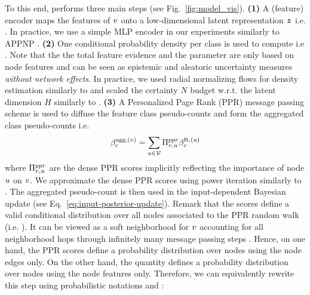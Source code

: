To this end, \oursacro{} performs three main steps (see Fig.~\ref{fig:model_vis}). \textbf{(1)} A (feature) encoder maps the features of $v$ onto a low-dimensional latent representation $\bm{z}$ i.e. . In practice, we use a simple MLP encoder in our experiments similarly to APPNP \citep{Klicpera2018}. \textbf{(2)} One conditional probability density per class \smash{$\prob(\z^{(\nodev)} \condition \iclass; \vphi)$} is used to compute  i.e . Note that the the total feature evidence  and the parameter  are only based on node features and can be seen as epistemic and aleatoric uncertainty measures \emph{without network effects}. In practice, we used radial normalizing flows for density estimation similarly to \citep{charpentier2020} and scaled the certainty $N$ budget w.r.t. the latent dimension $H$ similarly to \citep{NatPN2021}. \textbf{(3)} A Personalized Page Rank (PPR) message passing scheme is used to diffuse the feature class pseudo-counts  and form the aggregated class pseudo-counts  i.e.
\begin{equation}\label{eq:agg-evidence}
    \beta_c^{\text{agg}, (v)} = \sum_{u \in \mathcal{V}} \Pi^{ppr}_{v, u} \beta_c^{\text{ft}, (u)}
\end{equation}
where $\Pi^{ppr}_{v, u}$ are the dense PPR scores implicitly reflecting the importance of node $u$ on $v$. We approximate the dense PPR scores using power iteration similarly to \citep{Klicpera2018}. The aggregated pseudo-count  is then used in the input-dependent Bayesian update (see Eq.~\ref{eq:input-posterior-update}). Remark that the scores  define a valid conditional distribution over all nodes associated to the PPR random walk (i.e. ). It can be viewed as a soft neighborhood for $v$ accounting for all neighborhood hops through infinitely many message passing steps \citep{Klicpera2018}. Hence, on one hand, the PPR scores define a probability distribution over nodes using the node edges only. On the other hand, the quantity \smash{$\prob(\z^{(\nodeu)} \condition \iclass; \vphi)$} defines a probability distribution over nodes using the node features only. Therefore, we can equivalently rewrite this step using probabilistic notations  and \smash{$\prob(\nodeu \condition \iclass) = \prob(\z^{(\nodeu)} \condition \iclass; \vphi)$}:
